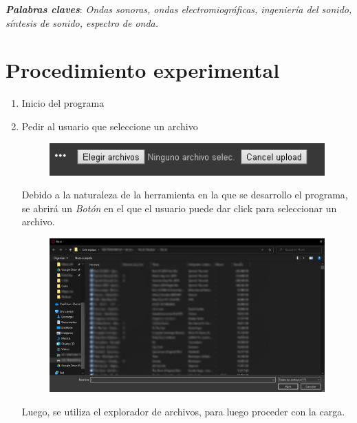 \documentclass[letterpaper, 12pt]{article}
\newcommand{\bolditalic}[1]{\textbf{\textit{#1}}}
\begin{document}
\noindent\makebox[\linewidth]{\rule{\linewidth}{0.4pt}}

\bolditalic{Palabras claves}: \textit{Ondas sonoras, ondas electromiográficas,
	ingeniería del sonido, síntesis de sonido, espectro de
	onda.}

\noindent\makebox[\linewidth]{\rule{\linewidth}{0.4pt}}

\section*{Procedimiento experimental}

\begin{enumerate}
	\item Inicio del programa
	\item Pedir al usuario que seleccione un archivo
	      \begin{figure}[H]
		      \begin{center}
			      \includegraphics[width=.5\linewidth]{./Images/FileUploadColab.PNG}
			      \caption{}
		      \end{center}
	      \end{figure}

	      Debido a la naturaleza de la herramienta en la que se
	      desarrollo el programa, se abrirá un \textit{Botón} en el
	      que el usuario puede dar click para seleccionar un archivo.

	      \begin{figure}[H]
		      \begin{center}
			      \includegraphics[width=.7\linewidth]{./Images/FileExplorer.png}
			      \caption{}
		      \end{center}
	      \end{figure}

	      Luego, se utiliza el explorador de archivos, para luego
	      proceder con la carga.


\end{enumerate}
\end{document}
